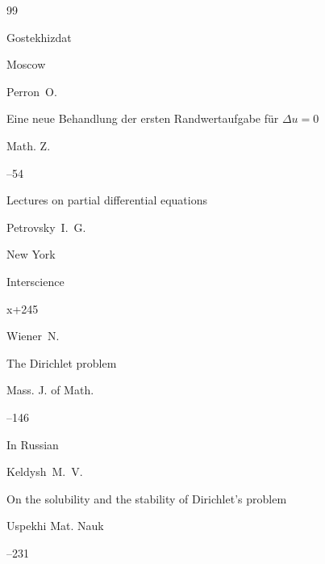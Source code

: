 \begin{thebibliography}{99}

\publ Gostekhizdat

\publaddr Moscow




\by Perron~O.

\paper Eine neue Behandlung der ersten Randwertaufgabe f\"ur $\Delta u = 0$

\jour Math. Z.



--54








\book Lectures on partial differential equations

\by Petrovsky~I.~G.

\publaddr New York

\publ  Interscience


\totalpages x+245




\by Wiener~N.

\paper The Dirichlet problem

\jour Mass. J. of Math.



--146





\lang In Russian

\by Keldysh~M.~V.

\paper On the solubility and the stability of Dirichlet's problem

\jour Uspekhi Mat. Nauk



--231




\end{thebibliography}
